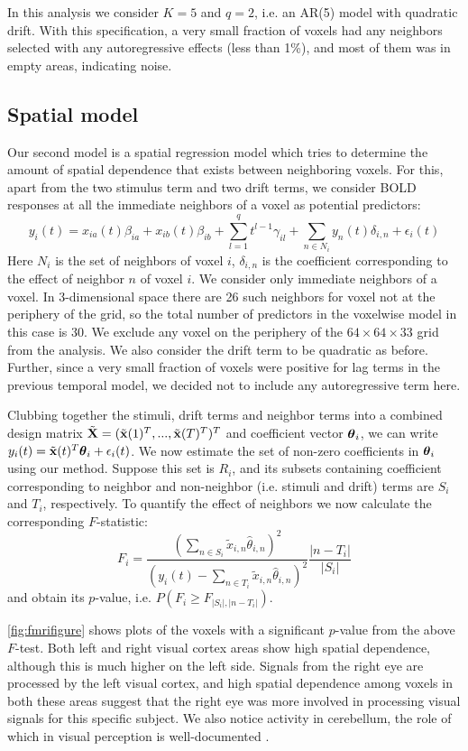 In this analysis we consider $K=5$ and $q=2$, i.e. an AR(5) model with quadratic drift. With this specification, a very small fraction of voxels had any neighbors selected with any autoregressive effects (less than 1\%), and most of them was in empty areas, indicating noise.

\subsection{Spatial model}
Our second model is a spatial regression model which tries to determine the amount of spatial dependence that exists between neighboring voxels. For this, apart from the two stimulus term and two drift terms, we consider BOLD responses at all the immediate neighbors of a voxel as potential predictors:
%
$$ y_i(t) = x_{ia}(t) \beta_{ia} + x_{ib}(t) \beta_{ib} + \sum_{l=1}^q t^{l-1} \gamma_{il} + \sum_{n \in N_i} y_n(t) \delta_{i,n} + \epsilon_i(t)
$$
%
Here $N_i$ is the set of neighbors of voxel $i$, $\delta_{i,n}$ is the coefficient corresponding to the effect of neighbor $n$ of voxel $i$. We consider only immediate neighbors of a voxel. In 3-dimensional space there are 26 such neighbors for voxel not at the periphery of the grid, so the total number of predictors in the voxelwise model in this case is 30. We exclude any voxel on the periphery of the $64 \times 64 \times 33$ grid from the analysis. We also consider the drift term to be quadratic as before. Further, since a very small fraction of voxels were positive for lag terms in the previous temporal model, we decided not to include any autoregressive term here.

Clubbing together the stimuli, drift terms and neighbor terms into a combined design matrix $\tilde {{\mathbf{X}}} = (\tilde {{\bf{x}}}(1)^T,...,\tilde {{\bf{x}}}(T)^T)^T$ and coefficient vector ${\boldsymbol{\theta}}_i$, we can write $y_i(t) = \tilde {{\bf{x}}}(t)^T {\boldsymbol{\theta}}_i + \epsilon_i(t) $. We now estimate the set of non-zero coefficients in ${\boldsymbol{\theta}}_i$ using our method. Suppose this set is $R_i$, and its subsets containing coefficient corresponding to neighbor and non-neighbor (i.e. stimuli and drift) terms are $S_i$ and $T_i$, respectively. To quantify the effect of neighbors we now calculate the corresponding $F$-statistic:
%
$$
F_i = \frac{(\sum_{n \in S_i} \tilde x_{i,n} \hat\theta_{i,n})^2}{(y_i(t) - \sum_{n \in T_i} \tilde x_{i,n} \hat\theta_{i,n})^2} \frac{|n-T_i|}{|S_i|}
$$
and obtain its $p$-value, i.e. $P(F_i \geq F_{|S_i|,|n-T_i|})$.

\ref{fig:fmrifigure} shows plots of the voxels with a significant $p$-value from the above $F$-test. Both left and right visual cortex areas show high spatial dependence, although this is much higher on the left side. Signals from the right eye are processed by the left visual cortex, and high spatial dependence among voxels in both these areas suggest that the right eye was more involved in processing visual signals for this specific subject. We also notice activity in cerebellum, the role of which in visual perception is well-documented \citep{CalhounEtal10, Kirschen10}.

